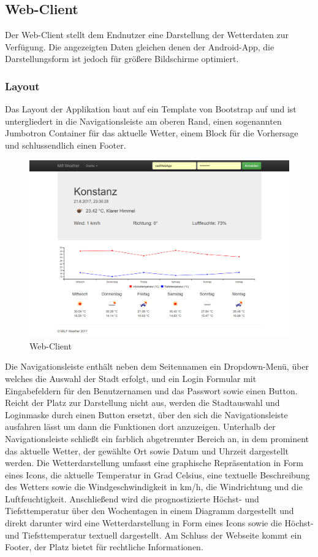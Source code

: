 \subsection{Web-Client} \label{Web-Client}
Der Web-Client stellt dem Endnutzer eine Darstellung der Wetterdaten zur Verfügung. Die angezeigten Daten gleichen denen der Android-App, die Darstellungsform ist jedoch für größere Bildschirme optimiert. 
\subsubsection{Layout}
Das Layout der Applikation baut auf ein Template von Bootstrap auf und ist untergliedert in die Navigationsleiste am oberen Rand, einen sogenannten Jumbotron Container für das aktuelle Wetter, einem Block für die Vorhersage und schlussendlich einen Footer. 
\begin{figure}[htbp]
	\centering
	\includegraphics[width=1.0\textwidth]{Bilder/Web-Client.png}
	\caption{Web-Client}
	\label{img:webclient}
\end{figure}
Die Navigationsleiste enthält neben dem Seitennamen ein Dropdown-Menü, über welches die Auswahl der Stadt erfolgt, und ein Login Formular mit Eingabefeldern für den Benutzernamen und das Passwort sowie einen Button. Reicht der Platz zur Darstellung nicht aus, werden die Stadtauswahl und Loginmaske durch einen Button ersetzt, über den sich die Navigationsleiste ausfahren lässt um dann die Funktionen dort anzuzeigen.
Unterhalb der Navigationsleiste schließt ein farblich abgetrennter Bereich an, in dem prominent das aktuelle Wetter, der gewählte Ort sowie Datum und Uhrzeit dargestellt werden. Die Wetterdarstellung umfasst eine graphische Repräsentation in Form eines Icons, die aktuelle Temperatur in Grad Celsius, eine textuelle Beschreibung des Wetters sowie die Windgeschwindigkeit in km/h, die Windrichtung und die Luftfeuchtigkeit.
Anschließend wird die prognostizierte Höchst- und Tiefsttemperatur über den Wochentagen in einem Diagramm dargestellt und direkt darunter wird eine Wetterdarstellung in Form eines Icons sowie die Höchst- und Tiefsttemperatur textuell dargestellt.
Am Schluss der Webseite kommt ein Footer, der Platz bietet für rechtliche Informationen.

